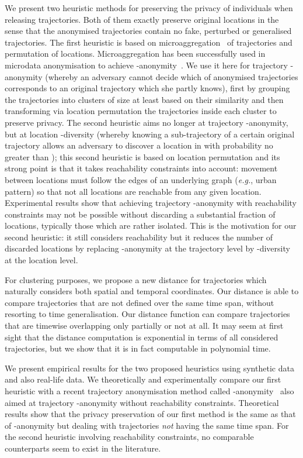 We present two heuristic methods for preserving the
privacy of individuals when releasing
trajectories. Both of them exactly preserve original locations
in the sense that the anonymised trajectories contain no fake, perturbed
or generalised trajectories.
The first heuristic is based on microaggregation~\cite{domingo02} of
trajectories and permutation of locations.
Microaggregation has been successfully used in microdata
anonymisation to achieve -anonymity~\cite{samarati98,sweeney02a,domingo05}.
We use it here for trajectory -anonymity (whereby an adversary
cannot decide which of  anonymised trajectories corresponds
to an original trajectory which she partly knows),
first by grouping the trajectories into clusters of size
at least  based on their similarity and then transforming
via location permutation the
trajectories inside each cluster to preserve privacy.
The second heuristic aims no longer at trajectory -anonymity,
but at location -diversity (whereby knowing a sub-trajectory
 of a certain original trajectory  allows an adversary to discover
a location in  with probability no greater than );
this second heuristic is based on location permutation
and its strong point is that
it takes reachability constraints into account:
movement between locations must follow the edges of an underlying graph
({\em e.g.}, urban pattern) so that not all locations are reachable
from any given location.
Experimental results show that
achieving trajectory -anonymity with reachability constraints
may not be possible without discarding
a substantial fraction of locations, typically those which are rather
isolated. This is the motivation for our second heuristic: it still
considers reachability but it reduces the number of discarded
locations by replacing -anonymity at the trajectory
level by -diversity at the location level.

For clustering purposes, we propose a new distance for trajectories
which naturally considers both spatial and temporal coordinates.
Our distance is able to compare trajectories
that are not defined over the same time span, without resorting
to time generalisation.
Our distance function can compare trajectories
that are timewise overlapping only
partially or not at all. It may seem at first sight that the distance
computation is exponential in terms of all considered trajectories, but
we show that it is in fact computable in polynomial time.

We present empirical results for the two proposed heuristics
using synthetic data and also real-life data.
We theoretically and experimentally compare our first heuristic
with a recent trajectory anonymisation method
called -anonymity~\cite{abul08} also aimed at
trajectory -anonymity without reachability constraints.
Theoretical results show that the privacy
preservation of our first method is the same as that of -anonymity
but dealing with trajectories \emph{not} having the same time span. For the second heuristic involving reachability constraints, no comparable counterparts
seem to exist in the literature.





